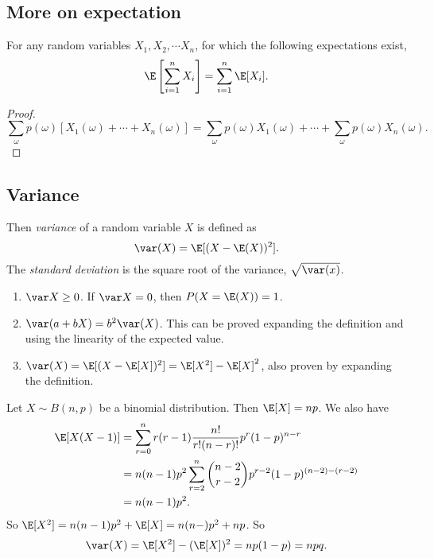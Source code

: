 \documentclass[a4paper]{article}
\begin{document}
\subsection{More on expectation}
\begin{thm}
  For any random variables $X_1, X_2, \cdots X_n$, for which the following expectations exist,
  \[
    \E\left[\sum_{i = 1}^n X_i\right] = \sum_{i = 1}^n \E[X_i].
  \]
\end{thm}

\begin{proof}
  \[
    \sum_\omega p(\omega)[X_1(\omega) + \cdots + X_n(\omega)] = \sum_\omega p(\omega)X_1(\omega) + \cdots + \sum_\omega p(\omega) X_n(\omega).
  \]
\end{proof}

\subsection{Variance}
\begin{defi}
  Then \emph{variance} of a random variable $X$ is defined as
  \[
    \var(X) = \E[(X - \E(X))^2].
  \]
  The \emph{standard deviation} is the square root of the variance, $\sqrt{\var(x)}$.
\end{defi}

\begin{thm}\leavevmode
  \begin{enumerate}
    \item $\var X \geq 0$. If $\var X = 0$, then $P(X = \E(X)) = 1$.
    \item $\var (a + bX) = b^2 \var(X)$. This can be proved expanding the definition and using the linearity of the expected value.
    \item $\var(X) = \E[(X - \E[X])^2] = \E[X^2] - \E[X]^2$, also proven by expanding the definition.
  \end{enumerate}
\end{thm}

\begin{eg}
  Let $X\sim B(n, p)$ be a binomial distribution. Then $\E[X] = np$. We also have
  \begin{align*}
    \E[X(X - 1)] &=  \sum_{r = 0}^n r(r - 1)\frac{n!}{r!(n - r)!} p^r(1 - p)^{n - r}\\
    &= n(n - 1)p^2\sum_{r = 2}^n \binom{n - 2}{r - 2} p^{r - 2}(1 - p)^{(n - 2) - (r - 2)}\\
    &= n(n - 1)p^2.
  \end{align*}
  So $\E[X^2] = n(n - 1)p^2 + \E[X] = n(n - )p^2 + np$. So
  \[
    \var(X) = \E[X^2] - (\E[X])^2  = np(1 - p) = npq.
  \]
\end{eg}
\end{document}
